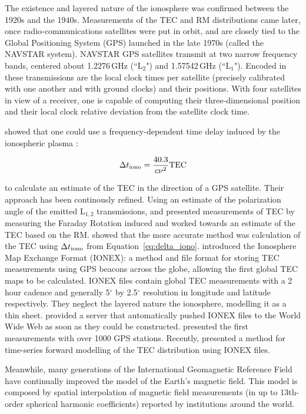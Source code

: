 The existence and layered nature of the ionosphere was confirmed between the 1920s and the 1940s. Measurements of the TEC and RM distributions came later, once radio-communications satellites were put in orbit, and are closely tied to the Global Positioning System (GPS) launched in the late 1970s (called the NAVSTAR system). NAVSTAR GPS satellites transmit at two narrow frequency bands, centered about 1.2276\,GHz (``L$_2$") and 1.57542\,GHz (``L$_1$"). Encoded in these transmissions are the local clock times per satellite (precisely calibrated with one another and with ground clocks) and their positions. With four satellites in view of a receiver, one is capable of computing their three-dimensional position and their local clock relative deviation from the satellite clock time. 

\cite{Macdoran.89} showed that one could use a frequency-dependent time delay induced by the ionospheric plasma \citep{Klobuchar.83, Brunner.93}:

\begin{equation}
\Delta t_{\rm iono} = \frac{40.3}{c\nu^2}{\rm TEC}
\label{eq:delta_iono}
\end{equation}

to calculate an estimate of the TEC in the direction of a GPS satellite. Their approach has been continously refined. 
Using an estimate of the polarization angle of the emitted L$_{1,2}$ transmissions, \cite{Titheridge.72} and \cite{Royden.84} presented measurements of TEC by measuring the Faraday Rotation induced and worked towards an estimate of the TEC based on the RM.
\cite{Lanyi.88} showed that the more accurate method was calculation of the TEC using $\Delta t_{\rm iono}$ from Equation~\ref{eq:delta_iono}.
\cite{Mannucci.98} introduced the Ionosphere Map Exchange Format (IONEX): a method and file format for storing TEC measurements using GPS beacons across the globe, allowing the first global TEC maps to be calculated. IONEX files contain global TEC measurements with a 2 hour cadence and generally 5$^\circ$ by 2.5$^\circ$ resolution in longitude and latitude respectively. They neglect the layered nature the ionosphere, modelling it as a thin sheet.
\cite{Iijima.99} provided a server that automatically pushed IONEX files to the World Wide Web as soon as they could be constructed.
\cite{Komjathy.05} presented the first measurements with over 1000 GPS stations.
Recently, \cite{Erdogan.16} presented a method for time-series forward modelling of the TEC distribution using IONEX files.

Meanwhile, many generations of the International Geomagnetic Reference Field \citep[IGRF][]{Finlay.10} have continually improved the model of the Earth's magnetic field. This model is composed by spatial interpolation of magnetic field measurements (in up to 13th-order spherical harmonic coefficients) reported by institutions around the world.

